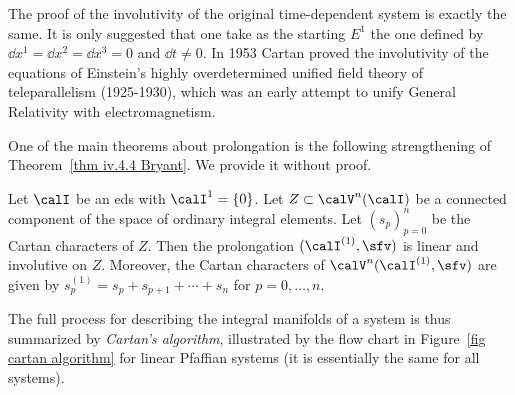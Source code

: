 \begin{example}
    The proof of the involutivity of the original time-dependent system is exactly the same. It is only suggested that one take as the starting $E^1$ the one defined by $\dd x^1=\dd x^2=\dd x^3=0$ and $\dd t\neq 0$. In 1953 Cartan proved the involutivity of the equations of Einstein's highly overdetermined unified field theory of teleparallelism (1925-1930), which was an early attempt to unify General Relativity with electromagnetism.
\end{example}

One of the main theorems about prolongation is the following strengthening of Theorem~\ref{thm iv.4.4 Bryant}. We provide it without proof.

\begin{thm}\label{thm vi.2.1 Bryant}
    Let $\calI$ be an \gls{eds} with $\calI^1=\{0\}$. Let $Z\subset\calV^n(\calI)$ be a connected component of the space of ordinary integral elements. Let $(s_p)_{p=0}^n$ be the Cartan characters of $Z$. Then the prolongation $(\calI^{(1)},\sfv)$ is linear and involutive on $Z$. Moreover, the Cartan characters of $\calV^n(\calI^{(1)},\sfv)$ are given by $s_p^{(1)}=s_p+s_{p+1}+\cdots+s_n$ for $p=0,\ldots,n$.
\end{thm}

The full process for describing the integral manifolds of a system is thus summarized by \emph{Cartan's algorithm}, illustrated by the flow chart in Figure~\ref{fig cartan algorithm} for linear Pfaffian systems (it is essentially the same for all systems). 

